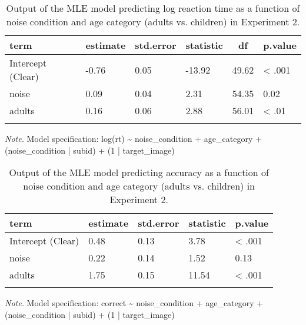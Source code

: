 \documentclass[,man,floatsintext]{apa6}
\begin{document}
\begin{appendix}
\begin{table}[h]
\begin{center}
\begin{threeparttable}
\caption{\label{tab:mle rt noise}Output of the MLE model predicting log reaction time as a function of noise condition and age category (adults vs. children) in Experiment 2.}
\begin{tabular}{llllll}
\toprule
term & \multicolumn{1}{c}{estimate} & \multicolumn{1}{c}{std.error} & \multicolumn{1}{c}{statistic} & \multicolumn{1}{c}{df} & \multicolumn{1}{c}{p.value}\\
\midrule
Intercept (Clear) & -0.76 & 0.05 & -13.92 & 49.62 & < .001\\
noise & 0.09 & 0.04 & 2.31 & 54.35 & 0.02\\
adults & 0.16 & 0.06 & 2.88 & 56.01 & < .01\\
\bottomrule
\addlinespace
\end{tabular}
\begin{tablenotes}[para]
\normalsize{\textit{Note.} Model specification: log(rt) \textasciitilde{} noise\_condition + age\_category + (noise\_condition | subid) + (1 | target\_image)}
\end{tablenotes}
\end{threeparttable}
\end{center}
\end{table}

\begin{table}[h]
\begin{center}
\begin{threeparttable}
\caption{\label{tab:mle acc noise}Output of the MLE model predicting accuracy as a function of noise condition and age category (adults vs. children) in Experiment 2.}
\begin{tabular}{lllll}
\toprule
term & \multicolumn{1}{c}{estimate} & \multicolumn{1}{c}{std.error} & \multicolumn{1}{c}{statistic} & \multicolumn{1}{c}{p.value}\\
\midrule
Intercept (Clear) & 0.48 & 0.13 & 3.78 & < .001\\
noise & 0.22 & 0.14 & 1.52 & 0.13\\
adults & 1.75 & 0.15 & 11.54 & < .001\\
\bottomrule
\addlinespace
\end{tabular}
\begin{tablenotes}[para]
\normalsize{\textit{Note.} Model specification: correct \textasciitilde{} noise\_condition + age\_category + (noise\_condition | subid) + (1 | target\_image)}
\end{tablenotes}
\end{threeparttable}
\end{center}
\end{table}


\end{appendix}
\end{document}
